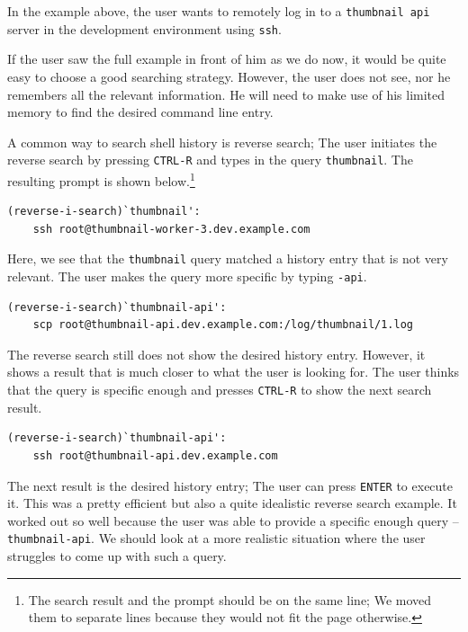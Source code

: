 In the example above, the user wants to remotely log in to a \verb|thumbnail api| server in the development environment using \verb|ssh|. 

If the user saw the full example in front of him as we do now, it would be quite easy to choose a good searching strategy. However, the user does not see, nor he remembers all the relevant information. He will need to make use of his limited memory to find the desired command line entry. 

A common way to search shell history is reverse search; The user initiates the reverse search by pressing \verb|CTRL-R| and types in the query \verb|thumbnail|. The resulting prompt is shown below.\footnote{The search result and the prompt should be on the same line; We moved them to separate lines because they would not fit the page otherwise.}

\begin{verbatim}
(reverse-i-search)`thumbnail': 
    ssh root@thumbnail-worker-3.dev.example.com
\end{verbatim}

Here, we see that the \verb|thumbnail| query matched a history entry that is not very relevant. The user makes the query more specific by typing \verb|-api|.

\begin{verbatim}
(reverse-i-search)`thumbnail-api': 
    scp root@thumbnail-api.dev.example.com:/log/thumbnail/1.log
\end{verbatim}

The reverse search still does not show the desired history entry. However, it shows a result that is much closer to what the user is looking for. The user thinks that the query is specific enough and presses \verb|CTRL-R| to show the next search result.

\begin{verbatim}
(reverse-i-search)`thumbnail-api':
    ssh root@thumbnail-api.dev.example.com
\end{verbatim}

The next result is the desired history entry; The user can press \verb|ENTER| to execute it. This was a pretty efficient but also a quite idealistic reverse search example. It worked out so well because the user was able to provide a specific enough query -- \verb|thumbnail-api|. We should look at a more realistic situation where the user struggles to come up with such a query. 

